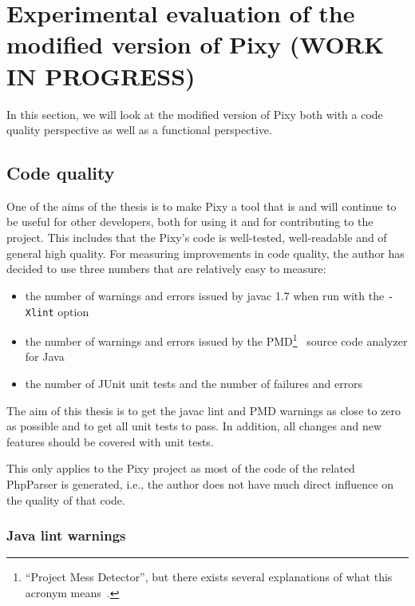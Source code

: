 \chapter{Experimental evaluation of the modified version of Pixy (WORK IN PROGRESS)}

In this section, we will look at the modified version of Pixy both with a code quality perspective as well as a functional perspective.

\section{Code quality}
\label{code-quality}
One of the aims of the thesis is to make Pixy a tool that is and will continue to be useful for other developers, both for using it and for contributing to the project. This includes that the Pixy's code is well-tested, well-readable and of general high quality. For measuring improvements in code quality, the author has decided to use three numbers that are relatively easy to measure:

\begin{itemize}
  \item the number of warnings and errors issued by javac 1.7 when run with the \texttt{-Xlint} option
  \item the number of warnings and errors issued by the PMD\footnote{``Project Mess Detector'', but there exists several explanations of what this acronym means~\cite{pmd-meaning}.}~\cite{pmd} source code analyzer for Java
  \item the number of JUnit unit tests and the number of failures and errors
\end{itemize}

The aim of this thesis is to get the javac lint and PMD warnings as close to zero as possible and to get all unit tests to pass. In addition, all changes and new features should be covered with unit tests.

This only applies to the Pixy project as most of the code of the related PhpParser is generated, i.e., the author does not have much direct influence on the quality of that code.

\subsection{Java lint warnings}

